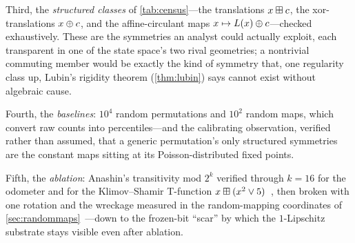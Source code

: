 Third, the \emph{structured classes} of \cref{tab:census}---the
translations $x \boxplus c$, the xor-translations $x \oplus c$, and
the affine-circulant maps $x \mapsto L(x) \oplus c$---checked
exhaustively. These are the symmetries an analyst could actually
exploit, each transparent in one of the state space's two rival
geometries; a nontrivial commuting member would be exactly the kind of
symmetry that, one regularity class up, Lubin's rigidity theorem
(\cref{thm:lubin}) says cannot exist without algebraic cause.

Fourth, the \emph{baselines}: $10^{4}$ random permutations and
$10^{2}$ random maps, which convert raw counts into percentiles---and
the calibrating observation, verified rather than assumed, that a
generic permutation's only structured symmetries are the constant maps
sitting at its Poisson-distributed fixed points.

Fifth, the \emph{ablation}: Anashin's transitivity mod $2^{k}$
\citep{Anashin2006} verified through $k = 16$ for the odometer and for
the Klimov--Shamir T-function $x \boxplus (x^{2} \vee
5)$~\citep{KlimovShamir2003}, then broken with one rotation and the
wreckage measured in the random-mapping coordinates of
\cref{sec:randommaps}~\citep{FlajoletOdlyzko1990}---down to the
frozen-bit ``scar'' by which the $1$-Lipschitz substrate stays visible
even after ablation.

\medskip

